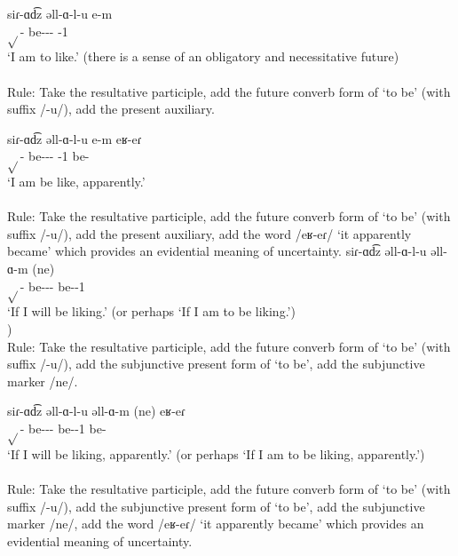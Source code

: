 \begin{exe}
\begin{xlist}
		\ex \gll siɾ-ɑd͡z əll-ɑ-l-u e-m \\
		$\sqrt{}$-{\rptcp} be-{\thgloss}-{\infgloss}-{\futcvb} {\aux}-1{\sg} \\
		\trans `I am to like.' (there is a sense of an obligatory and necessitative future) \\
		\\
		Rule: Take the resultative participle, add the future converb form of `to be' (with suffix /-u/), add the present auxiliary. 
		
		\ex \gll siɾ-ɑd͡z əll-ɑ-l-u e-m eʁ-eɾ \\
		$\sqrt{}$-{\rptcp} be-{\thgloss}-{\infgloss}-{\futcvb} {\aux}-1{\sg} be-{\eptcp} \\
		\trans `I am be like, apparently.' \\
		 \\
		Rule: Take the resultative participle, add the future converb form of `to be' (with suffix /-u/), add the present auxiliary, add the word /eʁ-eɾ/ `it apparently became' which provides an evidential meaning of uncertainty. 
		\ex \gll siɾ-ɑd͡z əll-ɑ-l-u əll-ɑ-m (ne) \\
		$\sqrt{}$-{\rptcp} be-{\thgloss}-{\infgloss}-{\futcvb} be-{\thgloss}-1{\sg} {\sbjv} \\
		\trans `If I will be liking.' (or perhaps `If I am to be liking.') \\
		) \\
		Rule: Take the resultative participle, add the future converb form of `to be' (with suffix /-u/), add the subjunctive present form of `to be', add the subjunctive marker /ne/. 
		
		\ex \gll siɾ-ɑd͡z əll-ɑ-l-u əll-ɑ-m (ne) eʁ-eɾ \\
		$\sqrt{}$-{\rptcp} be-{\thgloss}-{\infgloss}-{\futcvb} be-{\thgloss}-1{\sg} {\sbjv} be-{\eptcp} \\
		\trans `If I will be liking, apparently.' (or perhaps `If I am to be liking, apparently.')\\
		\\
		Rule: Take the resultative participle, add the future converb form of `to be' (with suffix /-u/), add the subjunctive present form of `to be', add the subjunctive marker /ne/, add the word /eʁ-eɾ/ `it apparently became' which provides an evidential meaning of uncertainty. 
		
	\end{xlist}
\end{exe}


